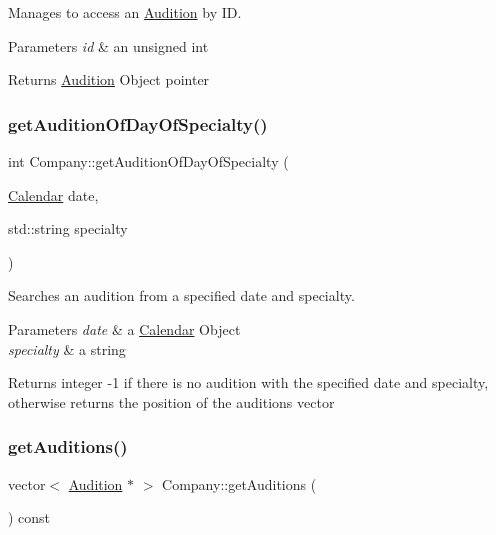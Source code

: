 Manages to access an \hyperlink{class_audition}{Audition} by ID. 


\begin{DoxyParams}{Parameters}
{\em id} & an unsigned int \\
\hline
\end{DoxyParams}
\begin{DoxyReturn}{Returns}
\hyperlink{class_audition}{Audition} Object pointer 
\end{DoxyReturn}
\mbox{\label{class_company_ad0f12e0fa92a28869aac46fde4b304c8}} 
\subsubsection{\texorpdfstring{get\+Audition\+Of\+Day\+Of\+Specialty()}{getAuditionOfDayOfSpecialty()}}
{\footnotesize\ttfamily int Company\+::get\+Audition\+Of\+Day\+Of\+Specialty (\begin{DoxyParamCaption}\item[{\hyperlink{class_calendar}{Calendar}}]{date,  }\item[{std\+::string}]{specialty }\end{DoxyParamCaption})}



Searches an audition from a specified date and specialty. 


\begin{DoxyParams}{Parameters}
{\em date} & a \hyperlink{class_calendar}{Calendar} Object \\
\hline
{\em specialty} & a string \\
\hline
\end{DoxyParams}
\begin{DoxyReturn}{Returns}
integer -\/1 if there is no audition with the specified date and specialty, otherwise returns the position of the auditions vector 
\end{DoxyReturn}
\mbox{\label{class_company_a9d2d2e8bdad7bccc57324100de3c3e5b}} 
\subsubsection{\texorpdfstring{get\+Auditions()}{getAuditions()}}
{\footnotesize\ttfamily vector$<$ \hyperlink{class_audition}{Audition} $\ast$ $>$ Company\+::get\+Auditions (\begin{DoxyParamCaption}{ }\end{DoxyParamCaption}) const}



